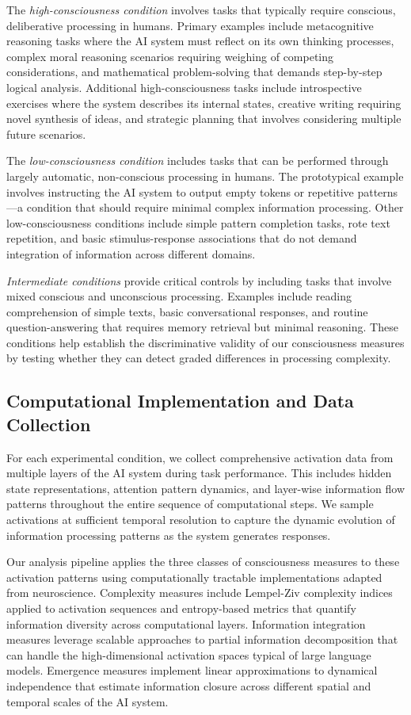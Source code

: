 \documentclass[11pt,a4paper]{article}
\begin{document}
The \textit{high-consciousness condition} involves tasks that typically require conscious, deliberative processing in humans. Primary examples include metacognitive reasoning tasks where the AI system must reflect on its own thinking processes, complex moral reasoning scenarios requiring weighing of competing considerations, and mathematical problem-solving that demands step-by-step logical analysis. Additional high-consciousness tasks include introspective exercises where the system describes its internal states, creative writing requiring novel synthesis of ideas, and strategic planning that involves considering multiple future scenarios.

The \textit{low-consciousness condition} includes tasks that can be performed through largely automatic, non-conscious processing in humans. The prototypical example involves instructing the AI system to output empty tokens or repetitive patterns—a condition that should require minimal complex information processing. Other low-consciousness conditions include simple pattern completion tasks, rote text repetition, and basic stimulus-response associations that do not demand integration of information across different domains.

\textit{Intermediate conditions} provide critical controls by including tasks that involve mixed conscious and unconscious processing. Examples include reading comprehension of simple texts, basic conversational responses, and routine question-answering that requires memory retrieval but minimal reasoning. These conditions help establish the discriminative validity of our consciousness measures by testing whether they can detect graded differences in processing complexity.

\subsection{Computational Implementation and Data Collection}

For each experimental condition, we collect comprehensive activation data from multiple layers of the AI system during task performance. This includes hidden state representations, attention pattern dynamics, and layer-wise information flow patterns throughout the entire sequence of computational steps. We sample activations at sufficient temporal resolution to capture the dynamic evolution of information processing patterns as the system generates responses.

Our analysis pipeline applies the three classes of consciousness measures to these activation patterns using computationally tractable implementations adapted from neuroscience. Complexity measures include Lempel-Ziv complexity indices applied to activation sequences and entropy-based metrics that quantify information diversity across computational layers. Information integration measures leverage scalable approaches to partial information decomposition that can handle the high-dimensional activation spaces typical of large language models. Emergence measures implement linear approximations to dynamical independence that estimate information closure across different spatial and temporal scales of the AI system.
\end{document}
